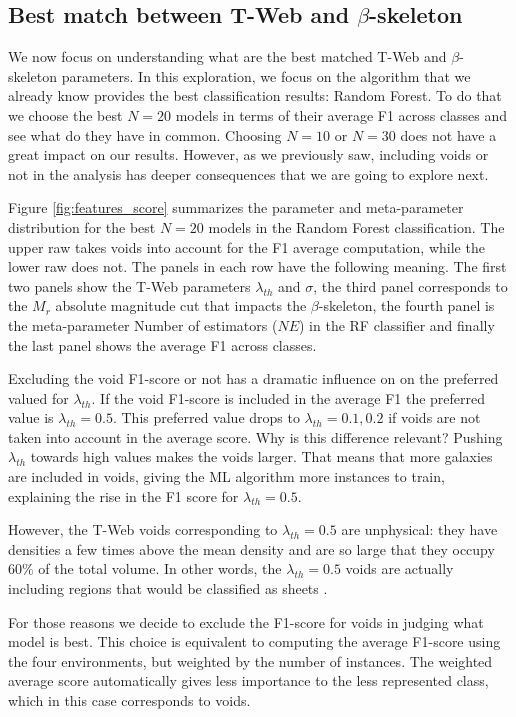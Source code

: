 \documentclass[usenatbib]{mnras}
\begin{document}
\subsection{Best match between T-Web and $\beta$-skeleton}

We now focus on understanding what are the best matched T-Web and
$\beta$-skeleton parameters.
In this exploration, we focus on the algorithm that we already know
provides the best classification results: Random Forest. 
To do that we choose the best $N=20$ models in terms of their average F1 across
classes and see what do they have in common.
Choosing $N=10$ or $N=30$ does not have a great impact on our
results. 
However, as we previously saw, including voids or not in the analysis
has deeper consequences that we are going to explore next.

Figure \ref{fig:features_score} summarizes the parameter and meta-parameter
distribution for the best $N=20$ models in the Random Forest
classification.
The upper raw takes voids into account for the F1 average computation,
while the lower raw does not.
The panels in each row have the following meaning.
The first two panels show the T-Web parameters
$\lambda_{th}$ and $\sigma$, the third panel corresponds to the $M_r$
absolute magnitude cut that impacts the $\beta$-skeleton, the fourth panel is the meta-parameter Number of estimators ($NE$) in the RF
classifier and finally the last panel shows the average F1 across classes. 

Excluding the void F1-score or not has a dramatic influence on
on the preferred valued for $\lambda_{th}$. 
If the void F1-score is included in the average F1 the preferred value is
$\lambda_{th}=0.5$. 
This preferred value drops to $\lambda_{th}=0.1 , 0.2$  if voids are not taken into account in the average score.
Why is this difference relevant?
Pushing $\lambda_{th}$ towards high values makes the voids larger.
That means that more galaxies are included in voids, giving the ML algorithm more instances to train, explaining the rise in the F1 score for $\lambda_{th}=0.5$.

However, the T-Web voids corresponding to $\lambda_{th}=0.5$ are unphysical: they have densities a few times above the mean
density and are so large that they occupy $60\%$ of the total volume.
In other words, the $\lambda_{th}=0.5$ voids are actually including regions that would be classified as sheets
\citep{2015MNRAS.453..497B, Forero-Romero2009}. 


For those reasons we decide to exclude the F1-score for voids in
judging what model is best.
This choice is equivalent to computing the average F1-score using the
four environments, but weighted by the number of instances. 
The weighted average score automatically gives less importance to the
less represented class, which in this case corresponds to voids.
\end{document}

